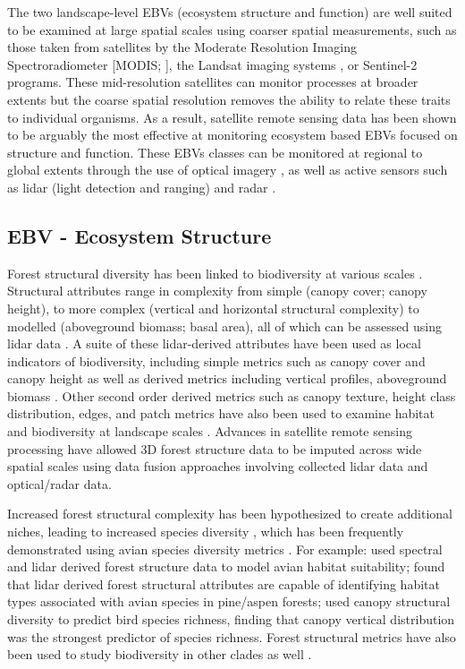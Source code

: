 \documentclass[
  authoryear,
  review,
  3p,
  twocolumn]{elsarticle}
\begin{document}
The two landscape-level EBVs (ecosystem structure and function) are well
suited to be examined at large spatial scales using coarser spatial
measurements, such as those taken from satellites by the Moderate
Resolution Imaging Spectroradiometer {[}MODIS; \citet{zhang2003}{]}, the
Landsat imaging systems \citep{fisher2006}, or Sentinel-2
\citep{helfenstein2022, darvishzadeh2019} programs. These mid-resolution
satellites can monitor processes at broader extents but the coarse
spatial resolution removes the ability to relate these traits to
individual organisms. As a result, satellite remote sensing data has
been shown to be arguably the most effective at monitoring ecosystem
based EBVs focused on structure and function. These EBVs classes can be
monitored at regional to global extents through the use of optical
imagery \citep{cohen2004}, as well as active sensors such as lidar
(light detection and ranging) and radar
\citep{guo2017, lefsky2002, lang2021, neuenschwander2019, coops2016}.

\hypertarget{ebv---ecosystem-structure}{%
\subsection{EBV - Ecosystem Structure}\label{ebv---ecosystem-structure}}

Forest structural diversity has been linked to biodiversity at various
scales \citep{guo2017, bergen2009, gao2014}. Structural attributes range
in complexity from simple (canopy cover; canopy height), to more complex
(vertical and horizontal structural complexity) to modelled (aboveground
biomass; basal area), all of which can be assessed using lidar data
\citep{coops2021}. A suite of these lidar-derived attributes have been
used as local indicators of biodiversity, including simple metrics such
as canopy cover and canopy height as well as derived metrics including
vertical profiles, aboveground biomass
\citep{lefsky1999, guo2017, coops2016}. Other second order derived
metrics such as canopy texture, height class distribution, edges, and
patch metrics have also been used to examine habitat and biodiversity at
landscape scales \citep{bergen2009}. Advances in satellite remote
sensing processing have allowed 3D forest structure data to be imputed
across wide spatial scales \citep{matasci2018, coops2021} using data
fusion approaches involving collected lidar data and optical/radar data.

Increased forest structural complexity has been hypothesized to create
additional niches, leading to increased species diversity
\citep{bergen2009}, which has been frequently demonstrated using avian
species diversity metrics \citep{macarthur1961}. For example:
\citet{herniman2020} used spectral and lidar derived forest structure
data to model avian habitat suitability; \citet{clawges2008} found that
lidar derived forest structural attributes are capable of identifying
habitat types associated with avian species in pine/aspen forests;
\citet{goetz2007} used canopy structural diversity to predict bird
species richness, finding that canopy vertical distribution was the
strongest predictor of species richness. Forest structural metrics have
also been used to study biodiversity in other clades as well
\citep{davies2014, nelson2005}.
\end{document}
